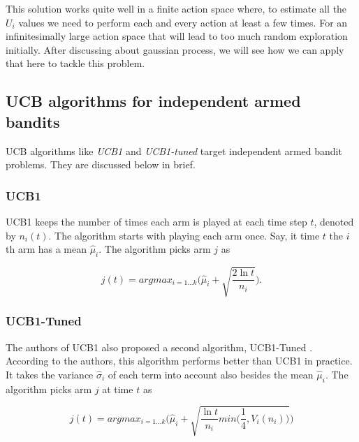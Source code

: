 \documentclass[english]{tktltiki}
\begin{document}
This solution works quite well in a finite action space where, to estimate all the $U_i$ values we need to perform each and every action at least a few times. For an infinitesimally large action space that will lead to too much random exploration initially. After discussing about gaussian process, we will see how we can apply that here to tackle this problem.

\subsection{UCB algorithms for independent armed bandits}

UCB algorithms like \textit{UCB1} and \textit{UCB1-tuned} target independent armed bandit problems. They are discussed below in brief.

\subsubsection{UCB1}

UCB1 \cite{independent_arm_bandits_1} keeps the number of times each arm is played at each time step $t$, denoted by $n_i(t)$. The algorithm starts with playing each arm once. Say, it time $t$ the $i$th arm has a mean $\hat{\mu}_i$. The algorithm picks arm $j$ as

\begin{equation}
	j(t) = arg max_{i = 1 ... k}\Bigg(\hat{\mu}_i + \sqrt{\frac{2 \ln t}{n_i}}\Bigg).
\end{equation}

\subsubsection{UCB1-Tuned}

The authors of UCB1 also proposed a second algorithm, UCB1-Tuned \cite{independent_arm_bandits_2}. According to the authors, this algorithm performs better than UCB1 in practice. It takes the variance $\hat{\sigma}_i$ of each term into account also besides the mean $\hat{\mu}_i$. The algorithm picks arm $j$ at time $t$ as

\begin{equation}
	j(t) = arg max_{i = 1 ... k}\Bigg(\hat{\mu}_i + \sqrt{\frac{\ln t}{n_i}min\Big(\frac{1}{4}, V_i(n_i)\Big)}\Bigg)
\end{equation}
\end{document}
